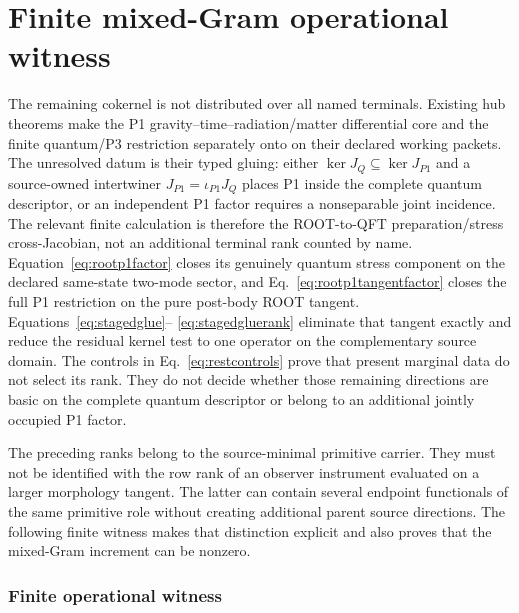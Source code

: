 \section{Finite mixed-Gram operational witness}
\label{app:p3rwwitness}

The remaining cokernel is not distributed over all named terminals.  Existing
hub theorems make the P1 gravity--time--radiation/matter differential core and
the finite quantum/P3 restriction separately onto on their declared working
packets.  The unresolved datum is their typed gluing: either
$\ker J_Q\subseteq\ker J_{P1}$ and a source-owned intertwiner
$J_{P1}=\iota_{P1}J_Q$ places P1 inside the complete quantum descriptor, or an
independent P1 factor requires a nonseparable joint incidence.  The relevant
finite calculation is therefore the ROOT-to-QFT preparation/stress
cross-Jacobian, not an additional terminal rank counted by name.
Equation~\eqref{eq:rootp1factor} closes its genuinely quantum stress component
on the declared same-state two-mode sector, and
Eq.~\eqref{eq:rootp1tangentfactor} closes the full P1 restriction on the pure
post-body ROOT tangent.  Equations~\eqref{eq:stagedglue}--
\eqref{eq:stagedgluerank} eliminate that tangent exactly and reduce the
residual kernel test to one operator on the complementary source domain.
The controls in Eq.~\eqref{eq:restcontrols} prove that present marginal data
do not select its rank. They do not decide whether those remaining directions are basic on the
complete quantum descriptor or belong to an additional jointly occupied P1
factor.

The preceding ranks belong to the source-minimal primitive carrier.  They
must not be identified with the row rank of an observer instrument evaluated
on a larger morphology tangent.  The latter can contain several endpoint
functionals of the same primitive role without creating additional parent
source directions.  The following finite witness makes that distinction
explicit and also proves that the mixed-Gram increment can be nonzero.

\subsubsection{Finite operational witness}

